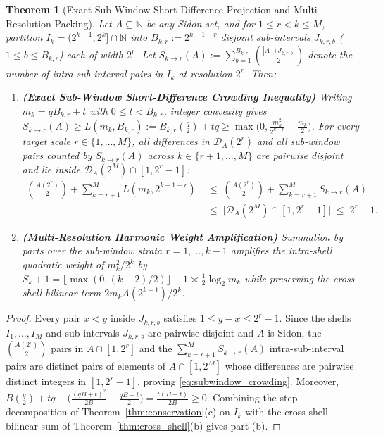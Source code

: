 \documentclass[11pt,reqno]{amsart}
\newtheorem{theorem}{Theorem}[section]
\theoremstyle{definition}
\theoremstyle{remark}
\begin{document}
\begin{theorem}[Exact Sub-Window Short-Difference Projection and Multi-Resolution Packing]\label{thm:subwindow_projection}
Let $A \subseteq \mathbb{N}$ be any Sidon set, and for $1 \le r < k \le M$, partition $I_k = (2^{k-1}, 2^k] \cap \mathbb{N}$ into $B_{k,r} := 2^{k-1-r}$ disjoint sub-intervals $J_{k,r,b}$ ($1 \le b \le B_{k,r}$) each of width $2^r$. Let $S_{k \to r}(A) := \sum_{b=1}^{B_{k,r}} \binom{|A \cap J_{k,r,b}|}{2}$ denote the number of intra-sub-interval pairs in $I_k$ at resolution $2^r$. Then:
\begin{enumerate}
  \item[\textup{(a)}] \textbf{(Exact Sub-Window Short-Difference Crowding Inequality)} Writing $m_k = q B_{k,r} + t$ with $0 \le t < B_{k,r}$, integer convexity gives $S_{k \to r}(A) \ge L(m_k, B_{k,r}) := B_{k,r}\binom{q}{2} + t q \ge \max\bigl(0, \frac{m_k^2}{2^{k-r}} - \frac{m_k}{2}\bigr)$. For every target scale $r \in \{1, \dots, M\}$, all differences in $\mathcal{D}_A(2^r)$ and all sub-window pairs counted by $S_{k \to r}(A)$ across $k \in \{r+1, \dots, M\}$ are pairwise disjoint and lie inside $\mathcal{D}_A(2^M) \cap [1, 2^r - 1]$:
  \begin{equation}\label{eq:subwindow_crowding}
    \begin{aligned}
      \binom{A(2^r)}{2} + \sum_{k=r+1}^M L(m_k, 2^{k-1-r}) &\;\le\; \binom{A(2^r)}{2} + \sum_{k=r+1}^M S_{k \to r}(A) \\
      &\;\le\; \bigl|\mathcal{D}_A(2^M) \cap [1, 2^r - 1]\bigr| \;\le\; 2^r - 1.
    \end{aligned}
  \end{equation}
  \item[\textup{(b)}] \textbf{(Multi-Resolution Harmonic Weight Amplification)} Summation by parts over the sub-window strata $r = 1, \dots, k-1$ amplifies the intra-shell quadratic weight of $m_k^2 / 2^k$ by $S_k + 1 = \lfloor \max(0, (k-2)/2) \rfloor + 1 \asymp \frac{1}{2}\log_2 m_k$ while preserving the cross-shell bilinear term $2 m_k A(2^{k-1}) / 2^k$.
\end{enumerate}
\end{theorem}

\begin{proof}
Every pair $x < y$ inside $J_{k,r,b}$ satisfies $1 \le y - x \le 2^r - 1$. Since the shells $I_1, \dots, I_M$ and sub-intervals $J_{k,r,b}$ are pairwise disjoint and $A$ is Sidon, the $\binom{A(2^r)}{2}$ pairs in $A \cap [1, 2^r]$ and the $\sum_{k=r+1}^M S_{k \to r}(A)$ intra-sub-interval pairs are distinct pairs of elements of $A \cap [1, 2^M]$ whose differences are pairwise distinct integers in $[1, 2^r - 1]$, proving \eqref{eq:subwindow_crowding}. Moreover, $B\binom{q}{2} + t q - \bigl(\frac{(q B + t)^2}{2 B} - \frac{q B + t}{2}\bigr) = \frac{t(B - t)}{2 B} \ge 0$. Combining the step-decomposition of Theorem~\ref{thm:conservation}(c) on $I_k$ with the cross-shell bilinear sum of Theorem~\ref{thm:cross_shell}(b) gives part (b).
\end{proof}
\end{document}
